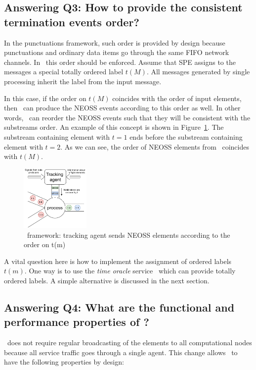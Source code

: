\subsection{Answering Q3: How to provide the consistent termination events order?}
In the punctuations framework, such order is provided by design because punctuations and ordinary data items go through the same FIFO network channels. In \tracker\, this order should be enforced. Assume that SPE assigns to the messages a special totally ordered label $t(M)$. All messages generated by single processing inherit the label from the input message. 

In this case, if the order on $t(M)$ coincides with the order of input elements, then \tracker\ can produce the NEOSS events according to this order as well. In other words, \tracker\ can reorder the NEOSS events such that they will be consistent with the substreams order. An example of this concept is shown in Figure~\ref{tracker_ordering}. The substream containing element with $t=1$ ends before the substream containing element with $t=2$. As we can see, the order of NEOSS elements from \tracker\ coincides with $t(M)$.

\begin{figure}[t]
  \centering
  \includegraphics[width=0.30\textwidth]{pics/tracker-ordering.pdf}
  \caption{\tracker\ framework: tracking agent sends NEOSS elements according to the order on t(m)}
  \label{tracker_ordering}
\end{figure}

A vital question here is how to implement the assignment of ordered labels $t(m)$. One way is to use the {\em time oracle} service~\cite{10.14778/3055330.3055335} which can provide totally ordered labels. A simple alternative is discussed in the next section. 

\subsection{Answering Q4: What are the functional and performance properties of \tracker?}

\tracker\ does not require regular broadcasting of the elements to all computational nodes because all service traffic goes through a single agent. This change allows \tracker\ to have the following properties by design:

